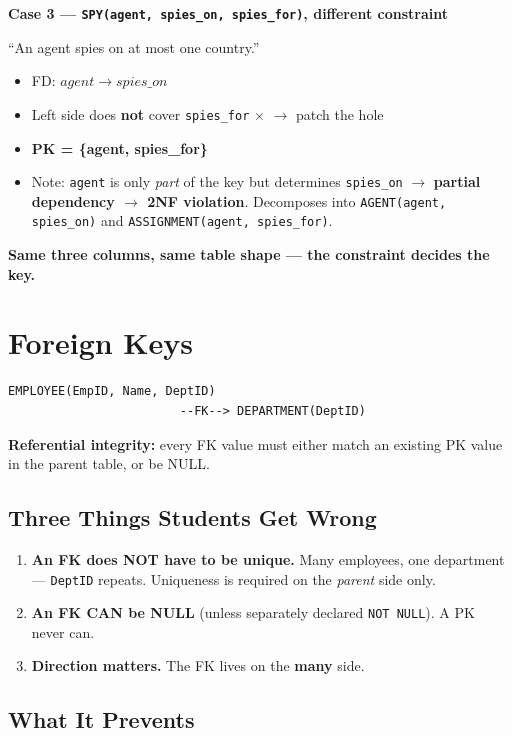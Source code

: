 \documentclass[12pt]{article}
\begin{document}
\textbf{Case 3 --- \texttt{SPY(agent, spies\_on, spies\_for)}, different constraint}

``An agent spies on at most one country.''
\begin{itemize}
    \item FD: $agent \to spies\_on$
    \item Left side does \textbf{not} cover \texttt{spies\_for} $\times$ $\to$ patch the hole
    \item \textbf{PK = \{agent, spies\_for\}}
    \item Note: \texttt{agent} is only \emph{part} of the key but determines
    \texttt{spies\_on} $\to$ \textbf{partial dependency $\to$ 2NF violation}.
    Decomposes into \texttt{AGENT(agent, spies\_on)} and
    \texttt{ASSIGNMENT(agent, spies\_for)}.
\end{itemize}

\textbf{Same three columns, same table shape --- the constraint decides the key.}

\section{Foreign Keys}

\begin{lstlisting}[style=plainschema]
EMPLOYEE(EmpID, Name, DeptID)
                        --FK--> DEPARTMENT(DeptID)
\end{lstlisting}

\textbf{Referential integrity:} every FK value must either match an existing PK
value in the parent table, or be NULL.

\subsection*{Three Things Students Get Wrong}

\begin{enumerate}
    \item \textbf{An FK does NOT have to be unique.} Many employees, one
    department --- \texttt{DeptID} repeats. Uniqueness is required on the
    \emph{parent} side only.
    \item \textbf{An FK CAN be NULL} (unless separately declared \texttt{NOT NULL}). A PK never can.
    \item \textbf{Direction matters.} The FK lives on the \textbf{many} side.
\end{enumerate}

\subsection*{What It Prevents}
\end{document}
